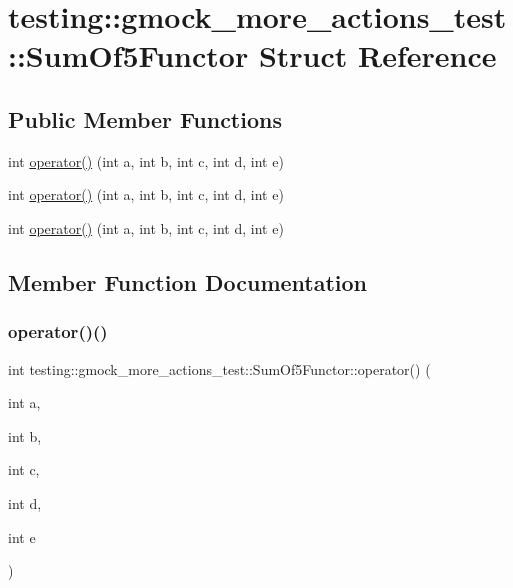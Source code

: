 \hypertarget{structtesting_1_1gmock__more__actions__test_1_1_sum_of5_functor}{}\section{testing\+::gmock\+\_\+more\+\_\+actions\+\_\+test\+::Sum\+Of5\+Functor Struct Reference}
\label{structtesting_1_1gmock__more__actions__test_1_1_sum_of5_functor}
\subsection*{Public Member Functions}
\begin{DoxyCompactItemize}
\item 
int \mbox{\hyperlink{structtesting_1_1gmock__more__actions__test_1_1_sum_of5_functor_ab7c80522ca7401c89e86eecb03fe1fbb}{operator()}} (int a, int b, int c, int d, int e)
\item 
int \mbox{\hyperlink{structtesting_1_1gmock__more__actions__test_1_1_sum_of5_functor_ab7c80522ca7401c89e86eecb03fe1fbb}{operator()}} (int a, int b, int c, int d, int e)
\item 
int \mbox{\hyperlink{structtesting_1_1gmock__more__actions__test_1_1_sum_of5_functor_ab7c80522ca7401c89e86eecb03fe1fbb}{operator()}} (int a, int b, int c, int d, int e)
\end{DoxyCompactItemize}


\subsection{Member Function Documentation}
\mbox{\label{structtesting_1_1gmock__more__actions__test_1_1_sum_of5_functor_ab7c80522ca7401c89e86eecb03fe1fbb}} 
\subsubsection{\texorpdfstring{operator()()}{operator()()}\hspace{0.1cm}{\footnotesize\ttfamily [1/3]}}
{\footnotesize\ttfamily int testing\+::gmock\+\_\+more\+\_\+actions\+\_\+test\+::\+Sum\+Of5\+Functor\+::operator() (\begin{DoxyParamCaption}\item[{int}]{a,  }\item[{int}]{b,  }\item[{int}]{c,  }\item[{int}]{d,  }\item[{int}]{e }\end{DoxyParamCaption})\hspace{0.3cm}{\ttfamily [inline]}}

